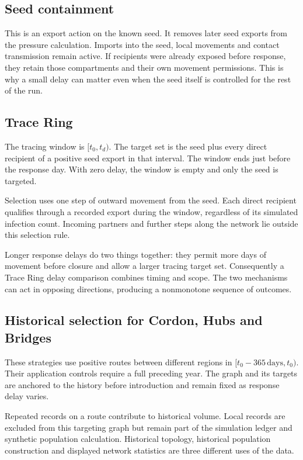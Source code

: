 \documentclass[11pt,a4paper]{article}
\begin{document}
\subsection{Seed containment}\label{seed-containment}

This is an export action on the known seed. It removes later seed
exports from the pressure calculation. Imports into the seed, local
movements and contact transmission remain active. If recipients were
already exposed before response, they retain those compartments and
their own movement permissions. This is why a small delay can matter
even when the seed itself is controlled for the rest of the run.

\subsection{Trace Ring}\label{trace-ring}

The tracing window is \([t_0, t_d)\). The target set is the seed plus
every direct recipient of a positive seed export in that interval. The
window ends just before the response day. With zero delay, the window is
empty and only the seed is targeted.

Selection uses one step of outward movement from the seed. Each direct
recipient qualifies through a recorded export during the window,
regardless of its simulated infection count. Incoming partners and
further steps along the network lie outside this selection rule.

Longer response delays do two things together: they permit more days of
movement before closure and allow a larger tracing target set.
Consequently a Trace Ring delay comparison combines timing and scope.
The two mechanisms can act in opposing directions, producing a
nonmonotone sequence of outcomes.

\subsection{Historical selection for Cordon, Hubs and
Bridges}\label{historical-selection-for-cordon-hubs-and-bridges}

These strategies use positive routes between different regions in
\([t_0-365 \,\text{days}, t_0)\). Their application controls require a
full preceding year. The graph and its targets are anchored to the
history before introduction and remain fixed as response delay varies.

Repeated records on a route contribute to historical volume. Local
records are excluded from this targeting graph but remain part of the
simulation ledger and synthetic population calculation. Historical
topology, historical population construction and displayed network
statistics are three different uses of the data.
\end{document}
